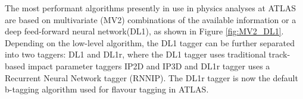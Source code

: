 \documentclass[letterpaper,12pt]{article}
\begin{document}

The most performant algorithms presently in use in physics 
analyses at ATLAS are based on multivariate (MV2) combinations 
of the available information or a deep feed-forward neural 
network(DL1)\cite{tagging}\cite{ATL-PHYS-PUB-2017-013}, as shown in 
Figure \ref{fig:MV2_DL1}. Depending on the low-level algorithm, 
the DL1 tagger can be further separated into two taggers: DL1 and DL1r,
 where the DL1 tagger uses traditional track-based impact parameter 
 taggers IP2D and IP3D and DL1r tagger uses a Recurrent Neural Network tagger 
 (RNNIP)\cite{ATL-PHYS-PUB-2017-013}. The DL1r tagger is now the 
 default b-tagging algorithm used for flavour tagging in ATLAS.
\end{document}
